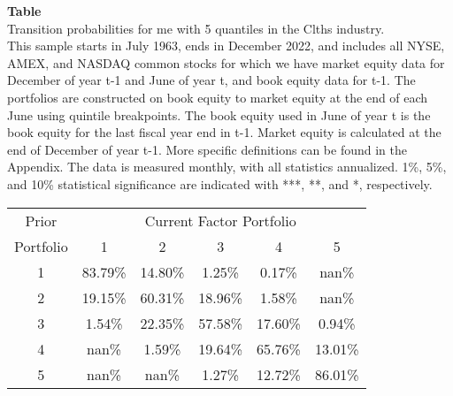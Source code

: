 \begin{table*}[ht!]
\raggedright
{}
\label{tab: transition_probs_me_Clths_with_5_quantiles}
\textbf{Table \thetable} \\
Transition probabilities for me with 5 quantiles in the Clths industry. \\
\hspace*{1em}This sample starts in July 1963, ends in December 2022, and includes all NYSE, AMEX, and NASDAQ common stocks for which we have market equity data for December of year t-1 and June of year t, and book equity data for t-1. The portfolios are constructed on book equity to market equity at the end of each June using quintile breakpoints.  The book equity used in June of year t is the book equity for the last fiscal year end in t-1.  Market equity is calculated at the end of December of year t-1.  More specific definitions can be found in the Appendix.  The data is measured monthly, with all statistics annualized.  1\%, 5\%, and 10\% statistical significance are indicated with ***, **, and *, respectively. \\
\vspace{0.5em}
\centering
\begin{adjustbox}{max width=\textwidth}
\begin{tabular}{@{}cccccc@{}}
\toprule
Prior & \multicolumn{5}{c}{Current Factor Portfolio} \\
Portfolio & 1 & 2 & 3 & 4 & 5 \\
\midrule
1 & 83.79\% & 14.80\% & 1.25\% & 0.17\% & nan\% \\
2 & 19.15\% & 60.31\% & 18.96\% & 1.58\% & nan\% \\
3 & 1.54\% & 22.35\% & 57.58\% & 17.60\% & 0.94\% \\
4 & nan\% & 1.59\% & 19.64\% & 65.76\% & 13.01\% \\
5 & nan\% & nan\% & 1.27\% & 12.72\% & 86.01\% \\
\bottomrule
\end{tabular}
\end{adjustbox}
\end{table*}